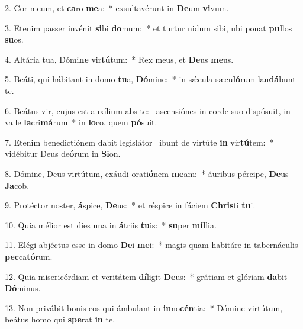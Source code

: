 2. Cor meum, et \textbf{ca}ro \textbf{me}a:~*  exsultavérunt in \textbf{De}um \textbf{vi}vum.\

3. Etenim passer invénit \textbf{si}bi \textbf{do}mum:~*  et turtur nidum sibi, ubi ponat \textbf{pul}los \textbf{su}os.\

4. Altária tua, Dómi\textbf{ne} vir\textbf{tú}tum:~*  Rex meus, et \textbf{De}us \textbf{me}us.\

5. Beáti, qui hábitant in domo \textbf{tu}a, \textbf{Dó}mine:~*  in sǽcula sæcu\textbf{ló}rum lau\textbf{dá}bunt te.\

6. Beátus vir, cujus est auxílium abs te: \dag\  ascensiónes in corde suo dispósuit, in valle \textbf{la}cri\textbf{má}rum~*  in \textbf{lo}co, quem \textbf{pó}suit.\

7. Etenim benedictiónem dabit legislátor \dag\  ibunt de virtúte \textbf{in} vir\textbf{tú}tem:~*  vidébitur Deus de\textbf{ó}rum in \textbf{Si}on.\

8. Dómine, Deus virtútum, exáudi orati\textbf{ó}nem \textbf{me}am:~*  áuribus pércipe, \textbf{De}us \textbf{Ja}cob.\

9. Protéctor noster, \textbf{á}spice, \textbf{De}us:~*  et réspice in fáciem \textbf{Chris}ti \textbf{tu}i.\

10. Quia mélior est dies una in \textbf{á}triis \textbf{tu}is:~*  \textbf{su}per \textbf{míl}lia.\

11. Elégi abjéctus esse in domo \textbf{De}i \textbf{me}i:~*  magis quam habitáre in tabernáculis \textbf{pec}ca\textbf{tó}rum.\

12. Quia misericórdiam et veritátem \textbf{dí}ligit \textbf{De}us:~*  grátiam et glóriam \textbf{da}bit \textbf{Dó}minus.\

13. Non privábit bonis eos qui ámbulant in \textbf{in}no\textbf{cén}tia:~*  Dómine virtútum, beátus homo qui \textbf{spe}rat \textbf{in} te.\

